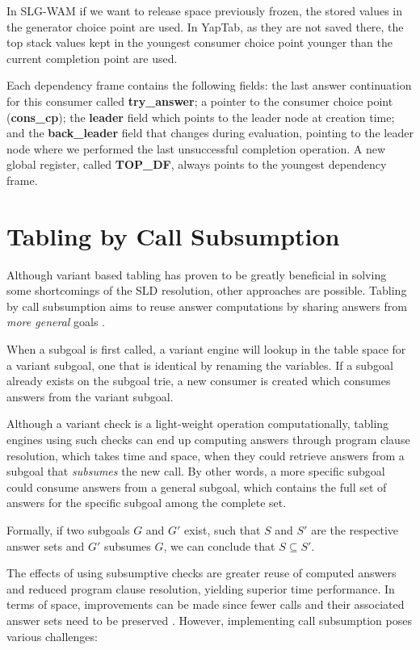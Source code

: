   In SLG-WAM if we want to release space previously frozen, the stored values in the generator choice point are used. In
  YapTab, as they are not saved there, the top stack values kept in the youngest consumer choice point younger than
  the current completion point are used.
  
  Each dependency frame contains the following fields: the last answer continuation for this consumer called \textbf{try\_answer};
  a pointer to the consumer choice point (\textbf{cons\_cp}); the \textbf{leader} field which points to the leader node
  at creation time; and the \textbf{back\_leader} field that changes during evaluation, pointing to the leader node where we
  performed the last unsuccessful completion operation. 
  A new global register, called \textbf{TOP\_DF}, always points to the youngest dependency frame.
  
\section{Tabling by Call Subsumption} \label{sec:subsumption}

Although variant based tabling has proven to be greatly beneficial in solving some shortcomings of the SLD resolution,
other approaches are possible. Tabling by call subsumption aims to reuse answer computations by sharing answers from
\textit{more general} goals \cite{Johnson-99}.

When a subgoal is first called, a variant engine will lookup in the table space for a variant subgoal, one that is
identical by renaming the variables. If a subgoal already exists on the subgoal trie, a new consumer is created which
consumes answers from the variant subgoal.

Although a variant check is a light-weight operation computationally,
tabling engines using such checks can end up computing answers through program clause resolution, which takes time and space,
when they could retrieve answers from a subgoal that \textit{subsumes} the new call. By other words, a more specific subgoal
could consume answers from a general subgoal, which contains the full set of answers for the specific subgoal among the complete set.

Formally, if two subgoals $G$ and $G'$ exist, such that $S$ and $S'$ are the respective answer sets and
$G'$ subsumes $G$, we can conclude that $S \subseteq S'$.

The effects of using subsumptive checks are greater reuse of computed answers and reduced program clause resolution, yielding
superior time performance. In terms of space, improvements can be made since fewer calls and their associated answer sets
need to be preserved \cite{Johnson-99}.
However, implementing call subsumption poses various challenges:

